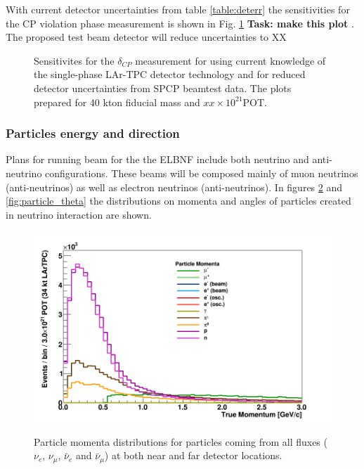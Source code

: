 With current detector uncertainties from table \ref{table:deterr} the sensitivities for the CP violation phase measurement is shown in Fig. \ref{fig:cpsensitivity}  {\bf Task: make this plot} . The  proposed test beam detector will reduce uncertainties to XX%



\begin{figure}[h!]
  \centering
\label{fig:cpsensitivity}
  \caption{Sensitivites for the $\delta_{CP}$ measurement  for using current knowledge of the single-phase LAr-TPC detector technology and for reduced detector uncertainties from SPCP beamtest data.  The plots prepared for 40 kton fiducial mass and $xx\times 10^{21}$POT.}
\end{figure}

\newpage

\subsubsection{Particles energy and direction}
Plans for running beam for the the ELBNF include both neutrino and anti-neutrino configurations. These beams will be composed  mainly of muon neutrinos (anti-neutrinos) as well as electron neutrinos (anti-neutrinos). In figures \ref{fig:particle_momenta} and \ref{fig:particle_theta} the distributions on momenta and angles of particles created in neutrino interaction are shown. 

\begin{figure}[h!]
  \centering
\includegraphics[scale=0.4]{figures/True_Momenta_per_Particle}
\label{fig:particle_momenta}
  \caption{Particle momenta distributions for particles coming from all fluxes ($\nu_e$, $\nu_\mu$, $\bar \nu_e$ and $\bar \nu_\mu$) at both near and far detector locations.  }
\end{figure}


